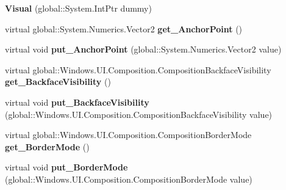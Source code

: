 \begin{DoxyCompactItemize}
\item 
\mbox{\label{class_windows_1_1_u_i_1_1_composition_1_1_visual_ae752ab49085c6766890dc632d053d6e8}} 
{\bfseries Visual} (global\+::\+System.\+Int\+Ptr dummy)
\item 
\mbox{\label{class_windows_1_1_u_i_1_1_composition_1_1_visual_a5c51998e94ec1776d9b212fef7f643c6}} 
virtual global\+::\+System.\+Numerics.\+Vector2 {\bfseries get\+\_\+\+Anchor\+Point} ()
\item 
\mbox{\label{class_windows_1_1_u_i_1_1_composition_1_1_visual_aa1b0464e36040159979a9f686b078861}} 
virtual void {\bfseries put\+\_\+\+Anchor\+Point} (global\+::\+System.\+Numerics.\+Vector2 value)
\item 
\mbox{\label{class_windows_1_1_u_i_1_1_composition_1_1_visual_ab37e8a416eb15adcf52595af082a3080}} 
virtual global\+::\+Windows.\+U\+I.\+Composition.\+Composition\+Backface\+Visibility {\bfseries get\+\_\+\+Backface\+Visibility} ()
\item 
\mbox{\label{class_windows_1_1_u_i_1_1_composition_1_1_visual_a3b737ed77f1a9773db7d7bba9085d735}} 
virtual void {\bfseries put\+\_\+\+Backface\+Visibility} (global\+::\+Windows.\+U\+I.\+Composition.\+Composition\+Backface\+Visibility value)
\item 
\mbox{\label{class_windows_1_1_u_i_1_1_composition_1_1_visual_aadde0309db11b0ab71defebf5ac36226}} 
virtual global\+::\+Windows.\+U\+I.\+Composition.\+Composition\+Border\+Mode {\bfseries get\+\_\+\+Border\+Mode} ()
\item 
\mbox{\label{class_windows_1_1_u_i_1_1_composition_1_1_visual_ad4fd972123d9a322d431e5f8790ba7b9}} 
virtual void {\bfseries put\+\_\+\+Border\+Mode} (global\+::\+Windows.\+U\+I.\+Composition.\+Composition\+Border\+Mode value)
\item 
\mbox{\label{class_windows_1_1_u_i_1_1_composition_1_1_visual_a35059d715a23e7424f1d2560320e1cab}} 

\end{DoxyCompactItemize}
